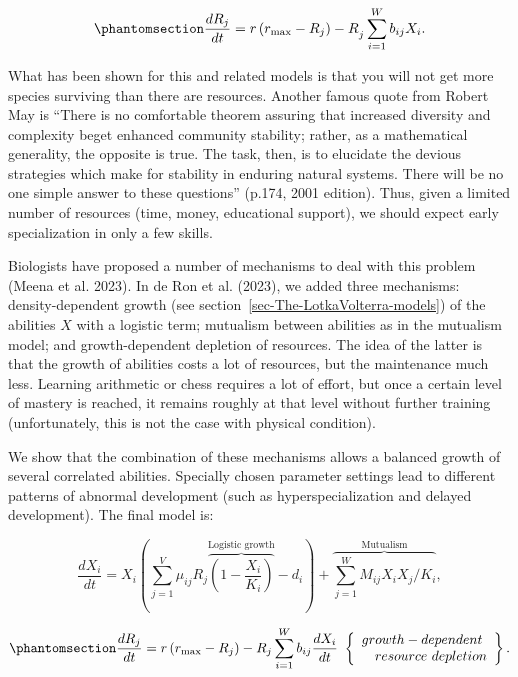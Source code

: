 \documentclass[
  a4paper,
  DIV=11,
  numbers=noendperiod,
  oneside]{scrreprt}
\begin{document}
\begin{equation}\phantomsection\label{eq-ch6-2-old-43}{
\frac{dR_{j}}{dt} = {r\left( r_{\max} - R_{j} \right) - R}_{j}\sum_{i = 1}^{W}{b_{ij}X_{i}}.
}\end{equation}

What has been shown for this and related models is that you will not get
more species surviving than there are resources. Another famous quote
from Robert May is ``There is no comfortable theorem assuring that
increased diversity and complexity beget enhanced community stability;
rather, as a mathematical generality, the opposite is true. The task,
then, is to elucidate the devious strategies which make for stability in
enduring natural systems. There will be no one simple answer to these
questions'' (p.174, 2001 edition). Thus, given a limited number of
resources (time, money, educational support), we should expect early
specialization in only a few skills.

Biologists have proposed a number of mechanisms to deal with this
problem (Meena et al. 2023). In de Ron et al. (2023), we added three
mechanisms: density-dependent growth (see
section~\ref{sec-The-LotkaVolterra-models}) of the abilities \(X\) with
a logistic term; mutualism between abilities as in the mutualism model;
and growth-dependent depletion of resources. The idea of the latter is
that the growth of abilities costs a lot of resources, but the
maintenance much less. Learning arithmetic or chess requires a lot of
effort, but once a certain level of mastery is reached, it remains
roughly at that level without further training (unfortunately, this is
not the case with physical condition).

We show that the combination of these mechanisms allows a balanced
growth of several correlated abilities. Specially chosen parameter
settings lead to different patterns of abnormal development (such as
hyperspecialization and delayed development). The final model is:

\[
\frac{dX_{i}}{dt} = X_{i}\left( \sum_{j = 1}^{V}{\mu_{ij}R_{j}\overset{\text{Logistic growth}}{\overbrace{\left( 1 - \frac{X_{i}}{K_{i}} \right)}}} - d_{i} \right) + \overset{\text{Mutualism}}{\overbrace{\sum_{j = 1}^{W}{M_{ij}X_{i}X_{j}\text{/}}K_{i}}},
\]

\begin{equation}\phantomsection\label{eq-ch6-3-old-44}{
\frac{dR_{j}}{dt} = r\left( r_{\max} - R_{j} \right) - R_{j}\sum_{i = 1}^{W}{b_{ij}\frac{dX_{i}}{dt}}\ \left\{ \begin{array}{r}
growth - dependent\  \\
resource\ depletion
\end{array} \right\}. \\
}\end{equation}
\end{document}
